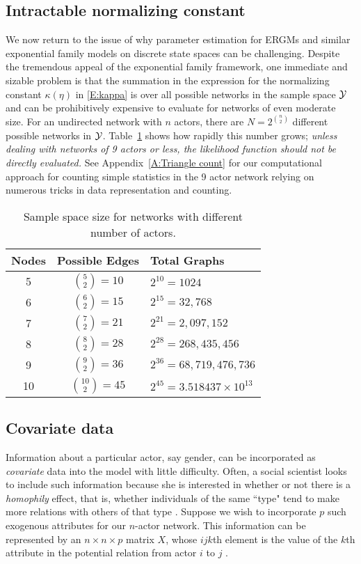 \subsection{Intractable normalizing constant} \label{S:intractable}
We now return to the issue of why parameter estimation for ERGMs and 
similar exponential family models on discrete state spaces can be challenging.
Despite the tremendous appeal of the exponential family framework, one 
immediate and sizable problem is that the summation in the expression for  the 
normalizing constant $\kappa(\eta)$ in \eqref{E:kappa}
is over all possible networks in the sample space ${\mathcal Y}$ and can be prohibitively expensive to 
evaluate for networks of even moderate size.
For an undirected network with $n$ actors, there are $N=2^{{n\choose 2} }$ 
different possible networks in ${\mathcal Y}$.  Table~\ref{T:number graphs} shows how rapidly this number grows; 
\emph{unless dealing with networks of 9 actors or less, the likelihood function 
should not be directly evaluated.}  See Appendix~\ref{A:Triangle count}
for our computational approach for counting simple statistics in the 9 actor network
relying on numerous tricks in data representation and counting.

\begin{table}[h] \label{T:number graphs}
\caption{Sample space size for networks with different number of actors.}
\begin{tabular}{ccl}
\hline 
Nodes & Possible Edges & Total Graphs \\ [1ex]
\hline
5 & ${5 \choose 2} = 10$ & $2^{10} = 1024$ \\ [1ex]
6 & ${6 \choose 2} = 15$ & $2^{15} = 32,768$ \\ [1ex]
7 & ${7 \choose 2} = 21$ & $2^{21} = 2,097,152$ \\ [1ex]
8 & ${8 \choose 2} = 28$ & $2^{28} = 268,435,456$ \\ [1ex]
9 & ${9 \choose 2} = 36$ & $2^{36} = 68,719,476,736$ \\ [1ex]
10 & ${10 \choose 2} = 45$ & $2^{45} = 3.518437\times10^{13}$ \\ [1ex]
\hline 
\end{tabular}
\end{table}

\subsection{Covariate data} \label{S:Covariate}
Information about a particular actor, say gender, can be incorporated as 
\textit{covariate} data into the model with little difficulty.
Often, a social scientist looks to include such information because she is interested in
whether or not there is a \emph{homophily} effect, that is, whether individuals of the 
same ``type" tend to make more relations with others of that type \citep{Wasserman:1994}.  
Suppose we wish to incorporate $p$ such exogenous attributes for our $n$-actor network.  
This information can be represented by an $n \times n \times p$ matrix $X$, whose 
$ijk$th element is the value of the $k$th attribute in the potential relation from actor
$i$ to $j$ \citep*{Fienberg:1981,ergm}.  

